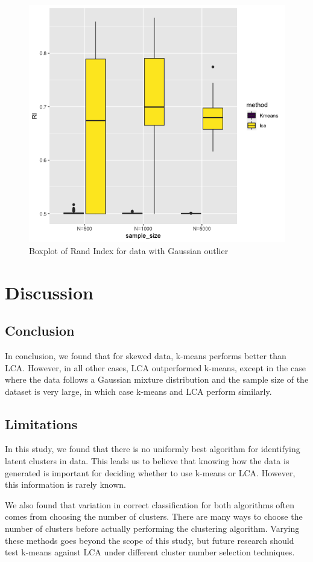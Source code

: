 \documentclass[
]{article}
\begin{document}
\begin{figure}

{\centering \includegraphics[width=0.5\linewidth]{report_image/RI_outlier} 

}

\caption{Boxplot of Rand Index for data with Gaussian outlier }\label{fig:unnamed-chunk-5}
\end{figure}

\hypertarget{discussion}{%
\section{Discussion}\label{discussion}}

\hypertarget{conclusion}{%
\subsection{Conclusion}\label{conclusion}}

In conclusion, we found that for skewed data, k-means performs better
than LCA. However, in all other cases, LCA outperformed k-means, except
in the case where the data follows a Gaussian mixture distribution and
the sample size of the dataset is very large, in which case k-means and
LCA perform similarly.

\hypertarget{limitations}{%
\subsection{Limitations}\label{limitations}}

In this study, we found that there is no uniformly best algorithm for
identifying latent clusters in data. This leads us to believe that
knowing how the data is generated is important for deciding whether to
use k-means or LCA. However, this information is rarely known.

We also found that variation in correct classification for both
algorithms often comes from choosing the number of clusters. There are
many ways to choose the number of clusters before actually performing
the clustering algorithm. Varying these methods goes beyond the scope of
this study, but future research should test k-means against LCA under
different cluster number selection techniques.
\end{document}
